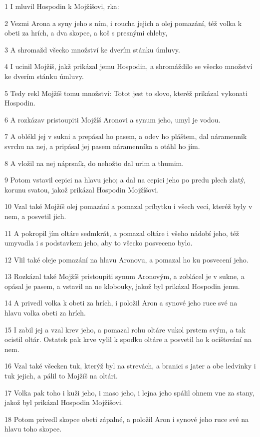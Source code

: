 \par 1 I mluvil Hospodin k Mojžíšovi, rka:
\par 2 Vezmi Arona a syny jeho s ním, i roucha jejich a olej pomazání, též volka k obeti za hrích, a dva skopce, a koš s presnými chleby,
\par 3 A shromažd všecko množství ke dverím stánku úmluvy.
\par 4 I ucinil Mojžíš, jakž prikázal jemu Hospodin, a shromáždilo se všecko množství ke dverím stánku úmluvy.
\par 5 Tedy rekl Mojžíš tomu množství: Totot jest to slovo, kteréž prikázal vykonati Hospodin.
\par 6 A rozkázav pristoupiti Mojžíš Aronovi a synum jeho, umyl je vodou.
\par 7 A oblékl jej v sukni a prepásal ho pasem, a odev ho pláštem, dal náramenník svrchu na nej, a pripásal jej pasem náramenníka a otáhl ho jím.
\par 8 A vložil na nej náprsník, do nehožto dal urim a thumim.
\par 9 Potom vstavil cepici na hlavu jeho; a dal na cepici jeho po predu plech zlatý, korunu svatou, jakož prikázal Hospodin Mojžíšovi.
\par 10 Vzal také Mojžíš olej pomazání a pomazal príbytku i všech vecí, kteréž byly v nem, a posvetil jich.
\par 11 A pokropil jím oltáre sedmkrát, a pomazal oltáre i všeho nádobí jeho, též umyvadla i s podstavkem jeho, aby to všecko posveceno bylo.
\par 12 Vlil také oleje pomazání na hlavu Aronovu, a pomazal ho ku posvecení jeho.
\par 13 Rozkázal také Mojžíš pristoupiti synum Aronovým, a zoblácel je v sukne, a opásal je pasem, a vstavil na ne klobouky, jakož byl prikázal Hospodin jemu.
\par 14 A privedl volka k obeti za hrích, i položil Aron a synové jeho ruce své na hlavu volka obeti za hrích.
\par 15 I zabil jej a vzal krev jeho, a pomazal rohu oltáre vukol prstem svým, a tak ocistil oltár. Ostatek pak krve vylil k spodku oltáre a posvetil ho k ocištování na nem.
\par 16 Vzal také všecken tuk, kterýž byl na strevách, a branici s jater a obe ledvinky i tuk jejich, a pálil to Mojžíš na oltári.
\par 17 Volka pak toho i kuži jeho, i maso jeho, i lejna jeho spálil ohnem vne za stany, jakož byl prikázal Hospodin Mojžíšovi.
\par 18 Potom privedl skopce obeti zápalné, a položil Aron i synové jeho ruce své na hlavu toho skopce.
